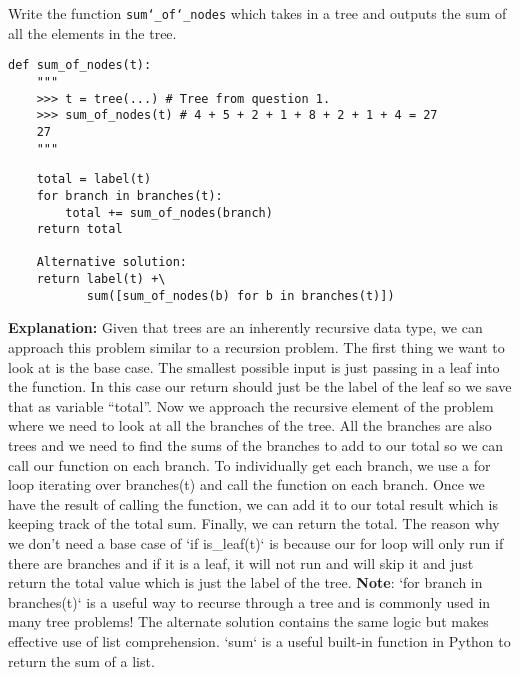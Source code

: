 \begin{blocksection}
\question Write the function \texttt{sum\char`_of\char`_nodes} which takes in a
tree and outputs the sum of all the elements in the tree.
\end{blocksection}

\begin{lstlisting}
def sum_of_nodes(t):
    """
    >>> t = tree(...) # Tree from question 1.
    >>> sum_of_nodes(t) # 4 + 5 + 2 + 1 + 8 + 2 + 1 + 4 = 27
    27
    """
\end{lstlisting}
\begin{solution}
\begin{lstlisting}
    total = label(t)
    for branch in branches(t):
        total += sum_of_nodes(branch)
    return total

    Alternative solution:
    return label(t) +\
           sum([sum_of_nodes(b) for b in branches(t)])
\end{lstlisting}
\textbf{Explanation:}
\newline
Given that trees are an inherently recursive data type, we can approach this problem similar to a recursion problem.
\newline
The first thing we want to look at is the base case. The smallest possible input is just passing in a leaf into the function. In this case our return should just be the label of the leaf so we save that as variable “total”.
\newline
Now we approach the recursive element of the problem where we need to look at all the branches of the tree. All the branches are also trees and we need to find the sums of the branches to add to our total so we can call our function on each branch.
\newline
To individually get each branch, we use a for loop iterating over branches(t) and call the function on each branch. Once we have the result of calling the function, we can add it to our total result which is keeping track of the total sum.
\newline
Finally, we can return the total. The reason why we don’t need a base case of `if is\_leaf(t)` is because our for loop will only run if there are branches and if it is a leaf, it will not run and will skip it and just return the total value which is just the label of the tree.
\newline
\textbf{Note}: `for branch in branches(t)` is a useful way to recurse through a tree and is commonly used in many tree problems!
The alternate solution contains the same logic but makes effective use of list comprehension. `sum` is a useful built-in function in Python to return the sum of a list.

\end{solution}

